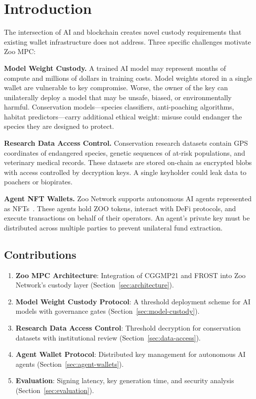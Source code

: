 \section{Introduction}


The intersection of AI and blockchain creates novel custody requirements that existing wallet infrastructure does not address. Three specific challenges motivate Zoo MPC:

\textbf{Model Weight Custody.} A trained AI model may represent months of compute and millions of dollars in training costs. Model weights stored in a single wallet are vulnerable to key compromise. Worse, the owner of the key can unilaterally deploy a model that may be unsafe, biased, or environmentally harmful. Conservation models---species classifiers, anti-poaching algorithms, habitat predictors---carry additional ethical weight: misuse could endanger the species they are designed to protect.

\textbf{Research Data Access Control.} Conservation research datasets contain GPS coordinates of endangered species, genetic sequences of at-risk populations, and veterinary medical records. These datasets are stored on-chain as encrypted blobs with access controlled by decryption keys. A single keyholder could leak data to poachers or biopirates.

\textbf{Agent NFT Wallets.} Zoo Network supports autonomous AI agents represented as NFTs~\cite{zoo-agent-nft}. These agents hold ZOO tokens, interact with DeFi protocols, and execute transactions on behalf of their operators. An agent's private key must be distributed across multiple parties to prevent unilateral fund extraction.

\subsection{Contributions}

\begin{enumerate}
    \item \textbf{Zoo MPC Architecture}: Integration of CGGMP21 and FROST into Zoo Network's custody layer (Section~\ref{sec:architecture}).

    \item \textbf{Model Weight Custody Protocol}: A threshold deployment scheme for AI models with governance gates (Section~\ref{sec:model-custody}).

    \item \textbf{Research Data Access Control}: Threshold decryption for conservation datasets with institutional review (Section~\ref{sec:data-access}).

    \item \textbf{Agent Wallet Protocol}: Distributed key management for autonomous AI agents (Section~\ref{sec:agent-wallets}).

    \item \textbf{Evaluation}: Signing latency, key generation time, and security analysis (Section~\ref{sec:evaluation}).
\end{enumerate}

